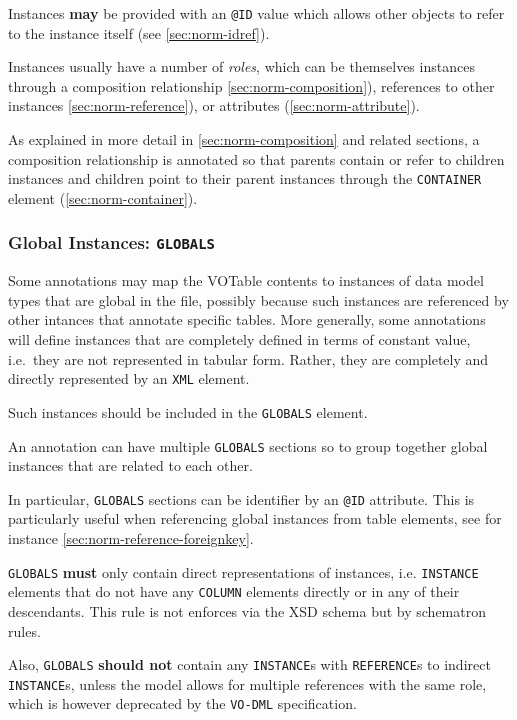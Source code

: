 \documentclass[11pt,a4paper]{ivoa}
\begin{document}
Instances \textbf{may} be provided with an \texttt{@ID} value which
allows other objects to refer to the instance itself (see
\ref{sec:norm-idref}).

Instances usually have a number of \emph{roles}, which can be themselves
instances through a composition relationship
\ref{sec:norm-composition}), references to other instances
\ref{sec:norm-reference}), or attributes (\ref{sec:norm-attribute}).

As explained in more detail in \ref{sec:norm-composition} and related
sections, a composition relationship is annotated so that parents
contain or refer to children instances and children point to their
parent instances through the \texttt{CONTAINER} element
(\ref{sec:norm-container}).

\subsubsection{Global Instances:
\texttt{GLOBALS}}\label{sec:norm-globals}

Some annotations may map the VOTable contents to instances of data model
types that are global in the file, possibly because such instances are
referenced by other intances that annotate specific tables. More
generally, some annotations will define instances that are completely
defined in terms of constant value, i.e.~they are not represented in
tabular form. Rather, they are completely and directly represented by an
\texttt{XML} element.

Such instances should be included in the \texttt{GLOBALS} element.

An annotation can have multiple \texttt{GLOBALS} sections so to group
together global instances that are related to each other.

In particular, \texttt{GLOBALS} sections can be identifier by an
\texttt{@ID} attribute. This is particularly useful when referencing
global instances from table elements, see for instance
\ref{sec:norm-reference-foreignkey}.

\texttt{GLOBALS} \textbf{must} only contain direct representations of
instances, i.e. \texttt{INSTANCE} elements that do not have any
\texttt{COLUMN} elements directly or in any of their descendants. This
rule is not enforces via the XSD schema but by schematron rules.

Also, \texttt{GLOBALS} \textbf{should not} contain any
\texttt{INSTANCE}s with \texttt{REFERENCE}s to indirect
\texttt{INSTANCE}s, unless the model allows for multiple references with
the same role, which is however deprecated by the \texttt{VO-DML}
specification.
\end{document}
